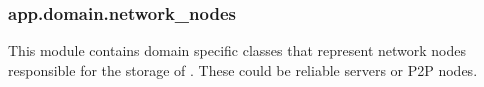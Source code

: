 \documentclass[letterpaper,10pt,english]{sphinxmanual}
\begin{document}
\subsubsection{app.domain.network\_nodes}
\label{\detokenize{app.domain:module-app.domain.network_nodes}}\label{\detokenize{app.domain:app-domain-network-nodes}}
This module contains domain specific classes that represent network nodes
responsible for the storage of {\hyperref[\detokenize{app.domain.helpers:app.domain.helpers.smart_dataclasses.FileBlockData}]{}}. These could be
reliable servers or P2P nodes.
\end{document}
